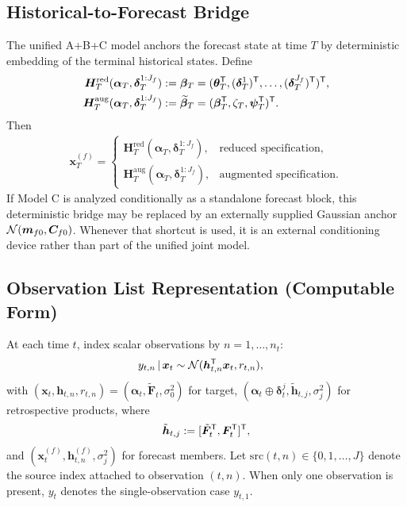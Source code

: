 \subsection{Historical-to-Forecast Bridge}
The unified A+B+C model anchors the forecast state at time $T$ by deterministic embedding of the
terminal historical states. Define
\begin{align}
\bm H_T^{\mathrm{red}}(\bm\alpha_T,\bm\delta_T^{1:J_f})
&:= \bm\beta_T
= (\bm\theta_T^{\mathsf{T}},(\bm\delta_T^1)^{\mathsf{T}},\dots,(\bm\delta_T^{J_f})^{\mathsf{T}})^{\mathsf{T}}, \\
\bm H_T^{\mathrm{aug}}(\bm\alpha_T,\bm\delta_T^{1:J_f})
&:= \widetilde{\bm\beta}_T
= (\bm\beta_T^{\mathsf{T}},\zeta_T,\bm\psi_T^{\mathsf{T}})^{\mathsf{T}}.
\end{align}
Then
\begin{align}
\bm x_T^{(f)}=
\begin{cases}
\bm H_T^{\mathrm{red}}(\bm\alpha_T,\bm\delta_T^{1:J_f}), & \text{reduced specification},\\
\bm H_T^{\mathrm{aug}}(\bm\alpha_T,\bm\delta_T^{1:J_f}), & \text{augmented specification}.
\end{cases}
\label{eq:fcast_bridge}
\end{align}
If Model C is analyzed conditionally as a standalone forecast block, this deterministic bridge may be
replaced by an externally supplied Gaussian anchor $\mathcal{N}(\bm m_{f0},\bm C_{f0})$.
Whenever that shortcut is used, it is an external conditioning device rather than part of the unified
joint model.

\subsection{Observation List Representation (Computable Form)}
At each time $t$, index scalar observations by $n=1,\dots,n_t$:
\begin{align}
y_{t,n} \,|\, \bm x_t &\sim \mathcal{N}(\bm h_{t,n}^{\mathsf{T}}\bm x_t,r_{t,n}), \label{eq:obs_list}
\end{align}
with $(\bm x_t,\bm h_{t,n},r_{t,n})=(\bm\alpha_t,\tilde{\bm F}_t,\sigma_0^2)$ for target,
$(\bm\alpha_t\oplus\bm\delta_t^j,\tilde{\bm h}_{t,j},\sigma_j^2)$ for retrospective products, where
\begin{align}
\tilde{\bm h}_{t,j}:=[\tilde{\bm F}_t^{\mathsf{T}},\bm F_t^{\mathsf{T}}]^{\mathsf{T}},
\end{align}
and $(\bm x_t^{(f)},\bm h_{t,n}^{(f)},\sigma_j^2)$ for forecast members.
Let $\mathrm{src}(t,n)\in\{0,1,\dots,J\}$ denote the source index attached to observation $(t,n)$.
When only one observation is present, $y_t$ denotes the single-observation case $y_{t,1}$.


